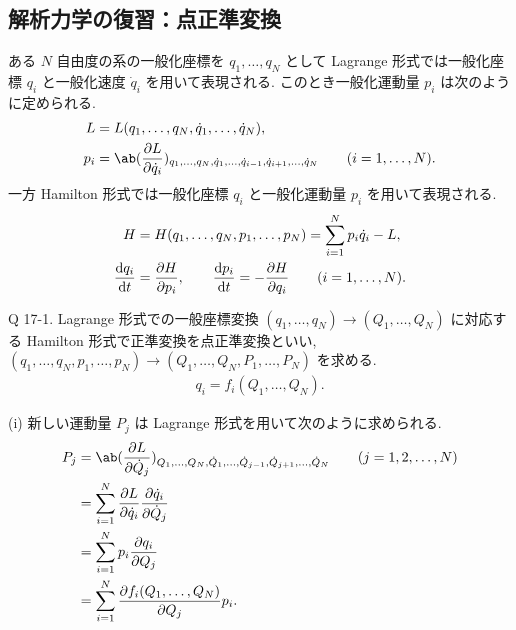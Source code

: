 \documentclass[uplatex,dvipdfmx,a4paper,11pt]{jlreq}
\numberwithin{equation}{section}
\theoremstyle{definition}
\begin{document}
\subsection{解析力学の復習：点正準変換}
ある $N$ 自由度の系の一般化座標を $q_1, \ldots, q_N$ として Lagrange 形式では一般化座標 $q_i$ と一般化速度 $\dot{q}_i$ を用いて表現される. このとき一般化運動量 $p_i$ は次のように定められる.
\begin{align}
  L   & = L(q_1,\ldots,q_N,\dot{q}_1,\ldots,\dot{q}_N),                                                                                     \\
  p_i & = \ab(\diffp{L}{\dot{q}_i})_{q_1,\ldots,q_N,\dot{q}_1,\ldots,\dot{q}_{i-1},\dot{q}_{i+1},\ldots,\dot{q}_N} \qquad (i = 1,\ldots,N).
\end{align}
一方 Hamilton 形式では一般化座標 $q_i$ と一般化運動量 $p_i$ を用いて表現される.
\begin{align}
  H             & = H(q_1,\ldots,q_N,p_1,\ldots,p_N) = \sum_{i=1}^{N}p_i\dot{q}_i - L,              \\
  \diff{q_i}{t} & = \diffp{H}{p_i}, \qquad \diff{p_i}{t} = -\diffp{H}{q_i} \qquad (i = 1,\ldots,N).
\end{align}

\begin{itembox}[l]{Q 17-1.}
  Lagrange 形式での一般座標変換 $(q_1,\ldots,q_N)\to(Q_1,\ldots,Q_N)$ に対応する Hamilton 形式で正準変換を点正準変換といい, $(q_1,\ldots,q_N,p_1,\ldots,p_N)\to(Q_1,\ldots,Q_N,P_1,\ldots,P_N)$ を求める.
  \begin{align}
    q_i = f_i(Q_1,\ldots,Q_N).
  \end{align}
\end{itembox}

(i) 新しい運動量 $P_j$ は Lagrange 形式を用いて次のように求められる.
\begin{align}
  P_j & = \ab(\diffp{L}{\dot{Q}_j})_{Q_1,\ldots,Q_N,\dot{Q}_1,\ldots,\dot{Q}_{j-1},\dot{Q}_{j+1},\ldots,\dot{Q}_N} \qquad (j=1,2,\ldots,N) \\
      & = \sum_{i=1}^{N}\diffp{L}{\dot{q}_i}\diffp{\dot{q}_i}{\dot{Q}_j}                                                                   \\
      & = \sum_{i=1}^{N}p_i\diffp{q_i}{Q_j}                                                                                                \\
      & = \sum_{i=1}^{N}\diffp{f_i(Q_1,\ldots,Q_N)}{Q_j}p_i.
\end{align}
\end{document}
